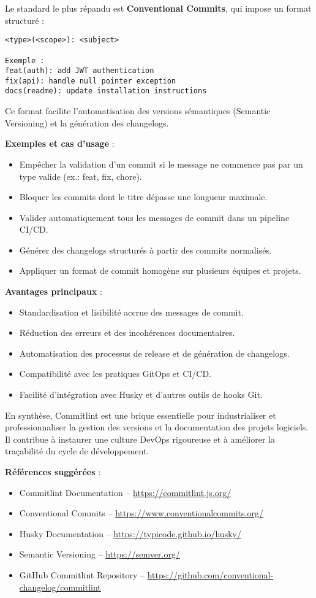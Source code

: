 Le standard le plus répandu est \textbf{Conventional Commits}, qui impose un format structuré  :
\begin{verbatim}
<type>(<scope>): <subject>

Exemple :
feat(auth): add JWT authentication
fix(api): handle null pointer exception
docs(readme): update installation instructions
\end{verbatim}

Ce format facilite l’automatisation des versions sémantiques (Semantic Versioning) et la génération des changelogs.

\textbf{Exemples et cas d’usage} :
\begin{itemize}
	\item Empêcher la validation d’un commit si le message ne commence pas par un type valide (ex.: feat, fix, chore).
	\item Bloquer les commits dont le titre dépasse une longueur maximale.
	\item Valider automatiquement tous les messages de commit dans un pipeline CI/CD.
	\item Générer des changelogs structurés à partir des commits normalisés.
	\item Appliquer un format de commit homogène sur plusieurs équipes et projets.
\end{itemize}

\textbf{Avantages principaux} :
\begin{itemize}
	\item Standardisation et lisibilité accrue des messages de commit.
	\item Réduction des erreurs et des incohérences documentaires.
	\item Automatisation des processus de release et de génération de changelogs.
	\item Compatibilité avec les pratiques GitOps et CI/CD.
	\item Facilité d’intégration avec Husky et d’autres outils de hooks Git.
\end{itemize}

En synthèse, Commitlint est une brique essentielle pour industrialiser et professionnaliser la gestion des versions et la documentation des projets logiciels. Il contribue à instaurer une culture DevOps rigoureuse et à améliorer la traçabilité du cycle de développement.

\textbf{Références suggérées} :
\begin{itemize}
	\item Commitlint Documentation – \url{https://commitlint.js.org/}
	\item Conventional Commits – \url{https://www.conventionalcommits.org/}
	\item Husky Documentation – \url{https://typicode.github.io/husky/}
	\item Semantic Versioning – \url{https://semver.org/}
	\item GitHub Commitlint Repository – \url{https://github.com/conventional-changelog/commitlint}
\end{itemize}


